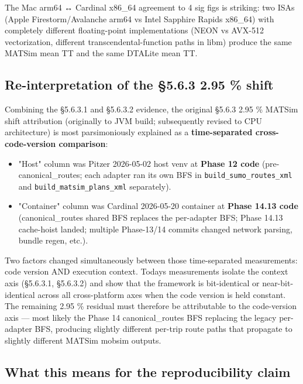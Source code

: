 The Mac arm64 ↔ Cardinal x86\_64 agreement to 4 sig figs is striking:
two ISAs (Apple Firestorm/Avalanche arm64 vs Intel Sapphire Rapids
x86\_64) with completely different floating-point implementations (NEON
vs AVX-512 vectorization, different transcendental-function paths in
libm) produce the same MATSim mean TT and the same DTALite mean TT.

\subsection{Re-interpretation of the §5.6.3 2.95 \%
shift}\label{5633-re-interpretation-of-the-563-295--shift}

Combining the §5.6.3.1 and §5.6.3.2 evidence, the original §5.6.3 2.95
\% MATSim shift attribution (originally to JVM build; subsequently
revised to CPU architecture) is most parsimoniously explained as a
\textbf{time-separated cross-code-version comparison}:

\begin{itemize}
\tightlist
\item
  "Host" column was Pitzer 2026-05-02 host venv at \textbf{Phase 12
  code} (pre-canonical\_routes; each adapter ran its own BFS in
  \texttt{build\_sumo\_routes\_xml} and
  \texttt{build\_matsim\_plans\_xml} separately).
\item
  "Container" column was Cardinal 2026-05-20 container at \textbf{Phase
  14.13 code} (canonical\_routes shared BFS replaces the per-adapter
  BFS; Phase 14.13 cache-hoist landed; multiple Phase-13/14 commits
  changed network parsing, bundle regen, etc.).
\end{itemize}

Two factors changed simultaneously between those time-separated
measurements: code version AND execution context.
Today\textquotesingle s measurements isolate the context axis (§5.6.3.1,
§5.6.3.2) and show that the framework is bit-identical or
near-bit-identical across all cross-platform axes when the code version
is held constant. The remaining 2.95 \% residual must therefore be
attributable to the code-version axis --- most likely the Phase 14
canonical\_routes BFS replacing the legacy per-adapter BFS, producing
slightly different per-trip route paths that propagate to slightly
different MATSim mobsim outputs.

\subsection{What this means for the reproducibility
claim}\label{what-this-means-for-the-reproducibility-claim}

